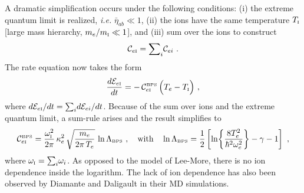 \documentclass[preprint,12pt,eqsecnum,nofootinbib,amsmath,amssymb]{revtex4}
\newcommand{\smI}{{\rm\scriptscriptstyle I}}
\newcommand{\smBPS}{{\rm\scriptscriptstyle BPS}}
\newcommand{\bibskip}{\baselineskip16pt plus 1pt minus 1pt}
\begin{document}
A dramatic simplification occurs under the following conditions: (i)
the extreme quantum limit is realized, {\em i.e.} $\bar\eta_{ab} \ll
1$, (ii) the ions have the same temperature $T_\smI$ [large mass
hierarchy, $m_e/m_\smI \ll 1$], and (iii) sum over the ions to
construct 
\begin{eqnarray}
  {\cal C}_{e\smI}={\sum}_i{\cal C}_{ei} \ .
\label{eq:{eq:C_eI_sum}}
\end{eqnarray}
\noindent
The rate equation now takes the form
\begin{eqnarray}
  \frac{d{\cal E}_{e\smI}}{dt}
  =
  -\, {\cal C}_{e\smI}^\smBPS \,\Big(T_e - T_\smI \Big)  \ ,
\label{eq:rate_eI}
\end{eqnarray}
\noindent
where $d{\cal E}_{e\smI}/dt={\sum}_i d{\cal E}_{ei}/dt$.  Because of
the sum over ions and the extreme quantum limit, a sum-rule arises and
the result simplifies to
\begin{eqnarray}
  {\cal C}_{e\smI}^\smBPS
  = 
  \frac{\omega_\smI^2}{2\pi}\, \kappa_e^2\,
  \sqrt{\frac{m_e}{2\pi\, T_e}}\, \ln\Lambda_\smBPS \ ,
  ~~~\text{with}~~~
  \ln\Lambda_\smBPS
  =
  \frac{1}{2}\left[\ln\!\left\{\frac{8 T_e^2}{\hbar^2 \omega_e^2}
  \right\} - \gamma - 1 \right] \ ,
\label{bpsrate}
\end{eqnarray}
\noindent
where $\omega_\smI={\sum}_i\omega_i$.  As opposed to the model of
Lee-More, there is no ion dependence inside the logarithm. The lack of
ion dependence has also been observed by Diamante and Daligault in
their MD simulations.



\end{document}
